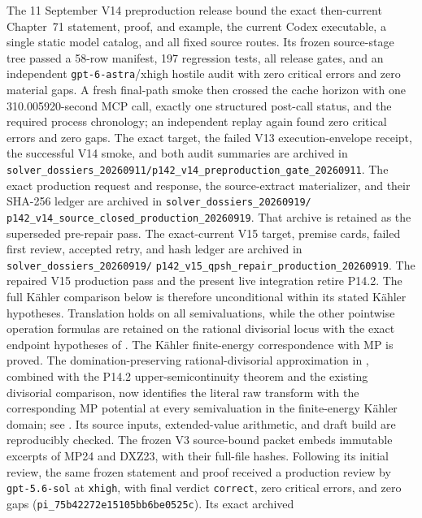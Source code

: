 The 11 September V14 preproduction release bound the exact then-current
Chapter~71 statement, proof, and example, the current Codex executable, a
single static model catalog, and all fixed source routes.  Its frozen
source-stage tree passed a 58-row manifest, 197 regression tests, all release
gates, and an independent \texttt{gpt-6-astra}/xhigh hostile audit with zero
critical errors and zero material gaps.  A fresh final-path smoke then crossed
the cache horizon with one 310.005920-second MCP call, exactly one structured
post-call status, and the required process chronology; an independent replay
again found zero critical errors and zero gaps.  The exact target, the failed
V13 execution-envelope receipt, the successful V14 smoke, and both audit
summaries are archived in
\nolinkurl{solver_dossiers_20260911/p142_v14_preproduction_gate_20260911}.
The exact production request and response, the source-extract materializer,
and their SHA-256 ledger are archived in
\nolinkurl{solver_dossiers_20260919/}
\nolinkurl{p142_v14_source_closed_production_20260919}.
That archive is retained as the superseded pre-repair pass.  The exact-current
V15 target, premise cards, failed first review, accepted retry, and hash ledger
are archived in
\nolinkurl{solver_dossiers_20260919/}
\nolinkurl{p142_v15_qpsh_repair_production_20260919}.
The repaired V15 production pass and the present live integration retire
P14.2.  The full
K\"ahler comparison below is therefore unconditional within its stated
K\"ahler hypotheses.
Translation holds on all semivaluations, while
the other pointwise operation formulas are retained on the rational
divisorial locus with the exact endpoint hypotheses of
\cite{Xia23Operations}.  The K\"ahler finite-energy correspondence with MP
is proved.  The domination-preserving rational-divisorial approximation in
, combined with the P14.2
upper-semicontinuity theorem and the existing divisorial comparison, now
identifies the literal raw transform with the corresponding MP potential at
every semivaluation in the finite-energy K\"ahler domain; see
. Its source inputs,
extended-value arithmetic, and draft build are reproducibly checked.  The
frozen V3 source-bound packet embeds immutable excerpts of MP24 and DXZ23,
with their full-file hashes.  Following its initial review, the same frozen
statement and proof received a production review by \texttt{gpt-5.6-sol} at
\texttt{xhigh}, with final verdict \texttt{correct}, zero critical errors,
and zero gaps (\texttt{pi\_75b42272e15105bb6be0525c}).  Its exact archived
